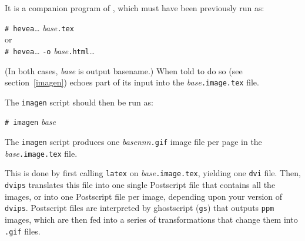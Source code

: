 It is a companion program of \hevea{}, which must have been previously run as:
\begin{flushleft}
\texttt{\# hevea}\ldots{} \textit{base}\texttt{.tex}\\
or\\
\texttt{\# hevea}\ldots{} \texttt{-o} \textit{base}\texttt{.html}\ldots\\
\end{flushleft}
(In both cases, \textit{base} is \hevea{} output basename.)
When told to do so (see section~\ref{imagen})
\hevea{} echoes part of its input into
the \textit{base}\texttt{.image.tex} file.

The \texttt{imagen} script should then be run as:
\begin{flushleft}
\texttt{\# imagen} \textit{base}
\end{flushleft}
The \texttt{imagen} script produces
one \textit{base}\textsl{nnn}\texttt{.gif} image file per page in the
\textit{base}\texttt{.image.tex} file.

This is done by first calling \texttt{latex} on
\textit{base}\texttt{.image.tex}, yielding one \texttt{dvi}
file.
Then, \texttt{dvips} translates this file into one single Postscript file that
contains all 
the images, or into one  Postscript file per image,
depending upon your version of \texttt{dvips}.
Postscript files are interpreted by ghostscript (\texttt{gs}) that
outputs \texttt{ppm} images, which are then fed into a series of
transformations that change them into \texttt{.gif} files.

